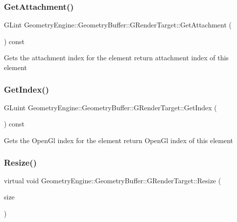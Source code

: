 \subsubsection{\texorpdfstring{GetAttachment()}{GetAttachment()}}
{\footnotesize\ttfamily G\+Lint Geometry\+Engine\+::\+Geometry\+Buffer\+::\+G\+Render\+Target\+::\+Get\+Attachment (\begin{DoxyParamCaption}{ }\end{DoxyParamCaption}) const\hspace{0.3cm}{\ttfamily [inline]}}

Gets the attachment index for the element return attachment index of this element \mbox{\label{class_geometry_engine_1_1_geometry_buffer_1_1_g_render_target_a68bde2ce731945e3f5668001403b1fed}} 
\subsubsection{\texorpdfstring{GetIndex()}{GetIndex()}}
{\footnotesize\ttfamily G\+Luint Geometry\+Engine\+::\+Geometry\+Buffer\+::\+G\+Render\+Target\+::\+Get\+Index (\begin{DoxyParamCaption}{ }\end{DoxyParamCaption}) const\hspace{0.3cm}{\ttfamily [inline]}}

Gets the Open\+Gl index for the element return Open\+Gl index of this element \mbox{\label{class_geometry_engine_1_1_geometry_buffer_1_1_g_render_target_ac1e54f456408b53de44fe10116d649dd}} 
\subsubsection{\texorpdfstring{Resize()}{Resize()}}
{\footnotesize\ttfamily virtual void Geometry\+Engine\+::\+Geometry\+Buffer\+::\+G\+Render\+Target\+::\+Resize (\begin{DoxyParamCaption}\item[{const Q\+Vector2D \&}]{size }\end{DoxyParamCaption})\hspace{0.3cm}{\ttfamily [pure virtual]}}

